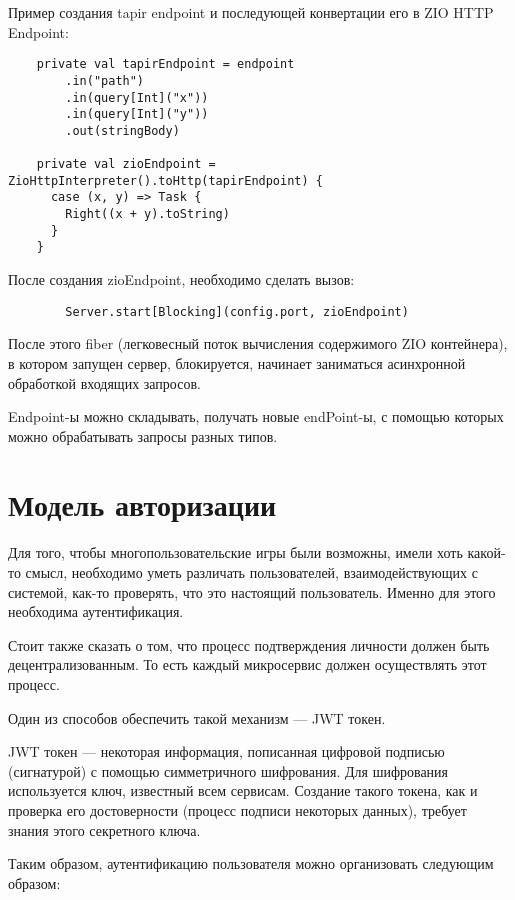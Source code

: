 \documentclass[14pt]{extarticle}
\begin{document}
    Пример создания tapir endpoint и последующей конвертации его в ZIO HTTP Endpoint:

    \begin{verbatim}
    private val tapirEndpoint = endpoint
        .in("path")
        .in(query[Int]("x"))
        .in(query[Int]("y"))
        .out(stringBody)

    private val zioEndpoint = ZioHttpInterpreter().toHttp(tapirEndpoint) {
      case (x, y) => Task {
        Right((x + y).toString)
      }
    }
    \end{verbatim}

    После создания zioEndpoint, необходимо сделать вызов:

    \begin{verbatim}
        Server.start[Blocking](config.port, zioEndpoint)
    \end{verbatim}

    После этого fiber (легковесный поток вычисления содержимого ZIO контейнера), в котором запущен сервер,
    блокируется, начинает заниматься асинхронной обработкой входящих запросов.

    Endpoint-ы можно складывать, получать новые endPoint-ы, с помощью которых можно обрабатывать запросы разных типов.

    \section{Модель авторизации}

    Для того, чтобы
    многопользовательские игры были
    возможны, имели хоть какой-то смысл, необходимо уметь различать пользователей, взаимодействующих с системой,
    как-то проверять, что это настоящий пользователь. Именно для этого необходима аутентификация.

    Стоит также сказать о том, что процесс подтверждения личности должен быть децентрализованным. То есть каждый
    микросервис должен осуществлять этот процесс.

    Один из способов обеспечить такой механизм --- JWT токен. \cite{jwt}

    JWT токен --- некоторая информация, пописанная цифровой подписью (сигнатурой) с помощью симметричного шифрования.
    Для шифрования используется ключ, известный всем сервисам. Создание такого токена, как и проверка его
    достоверности (процесс подписи некоторых
    данных), требует знания этого секретного ключа.

    Таким образом, аутентификацию пользователя можно организовать следующим образом:
\end{document}
